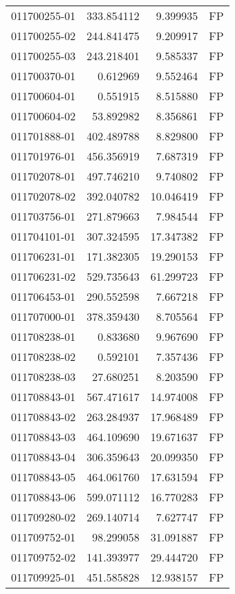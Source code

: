 \begin{tabular}{lrrl}
011700255-01 &  333.854112 &     9.399935 &   FP \\
011700255-02 &  244.841475 &     9.209917 &   FP \\
011700255-03 &  243.218401 &     9.585337 &   FP \\
011700370-01 &    0.612969 &     9.552464 &   FP \\
011700604-01 &    0.551915 &     8.515880 &   FP \\
011700604-02 &   53.892982 &     8.356861 &   FP \\
011701888-01 &  402.489788 &     8.829800 &   FP \\
011701976-01 &  456.356919 &     7.687319 &   FP \\
011702078-01 &  497.746210 &     9.740802 &   FP \\
011702078-02 &  392.040782 &    10.046419 &   FP \\
011703756-01 &  271.879663 &     7.984544 &   FP \\
011704101-01 &  307.324595 &    17.347382 &   FP \\
011706231-01 &  171.382305 &    19.290153 &   FP \\
011706231-02 &  529.735643 &    61.299723 &   FP \\
011706453-01 &  290.552598 &     7.667218 &   FP \\
011707000-01 &  378.359430 &     8.705564 &   FP \\
011708238-01 &    0.833680 &     9.967690 &   FP \\
011708238-02 &    0.592101 &     7.357436 &   FP \\
011708238-03 &   27.680251 &     8.203590 &   FP \\
011708843-01 &  567.471617 &    14.974008 &   FP \\
011708843-02 &  263.284937 &    17.968489 &   FP \\
011708843-03 &  464.109690 &    19.671637 &   FP \\
011708843-04 &  306.359643 &    20.099350 &   FP \\
011708843-05 &  464.061760 &    17.631594 &   FP \\
011708843-06 &  599.071112 &    16.770283 &   FP \\
011709280-02 &  269.140714 &     7.627747 &   FP \\
011709752-01 &   98.299058 &    31.091887 &   FP \\
011709752-02 &  141.393977 &    29.444720 &   FP \\
011709925-01 &  451.585828 &    12.938157 &   FP \\

\end{tabular}
